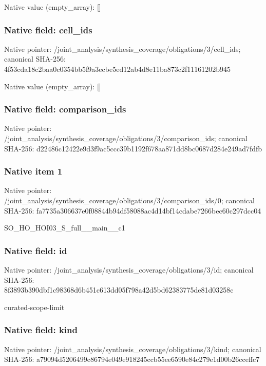 \documentclass[10pt,a4paper]{article}
\begin{document}
Native value (empty\_\allowbreak{}array): []

\subsubsection{Native field: cell\_\allowbreak{}ids}
Native pointer: /joint\_\allowbreak{}analysis/synthesis\_\allowbreak{}coverage/obligations/3/cell\_\allowbreak{}ids; canonical SHA-256: 4f53cda18c2baa0c0354bb5f9a3ecbe5ed12ab4d8e11ba873c2f11161202b945

Native value (empty\_\allowbreak{}array): []

\subsubsection{Native field: comparison\_\allowbreak{}ids}
Native pointer: /joint\_\allowbreak{}analysis/synthesis\_\allowbreak{}coverage/obligations/3/comparison\_\allowbreak{}ids; canonical SHA-256: d22486c12422e9d3f9ac5ccc39b1192f678aa871dd8bc0687d284e249ad7fdfb

\subsubsection{Native item 1}
Native pointer: /joint\_\allowbreak{}analysis/synthesis\_\allowbreak{}coverage/obligations/3/comparison\_\allowbreak{}ids/0; canonical SHA-256: fa7735a306637e0f08844b94df58088ac4d14bf14cdabe7266bec60c297dcc04

\begingroup\raggedright\sloppy SO\_\allowbreak{}HO\_\allowbreak{}HOI03\_\allowbreak{}S\_\allowbreak{}full\_\allowbreak{}\_\allowbreak{}main\_\allowbreak{}\_\allowbreak{}c1\par\endgroup

\subsubsection{Native field: id}
Native pointer: /joint\_\allowbreak{}analysis/synthesis\_\allowbreak{}coverage/obligations/3/id; canonical SHA-256: 8f3893b390dbf1c98368d6b451c613dd05f798a42d5bd62383775de81d03258c

\begingroup\raggedright\sloppy curated-scope-limit\par\endgroup

\subsubsection{Native field: kind}
Native pointer: /joint\_\allowbreak{}analysis/synthesis\_\allowbreak{}coverage/obligations/3/kind; canonical SHA-256: a79094d5206499c86794e049e918245ccb55ee6590e84c279e1d00b26cceffc7
\end{document}
